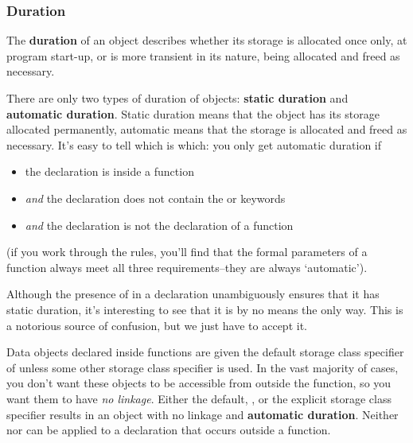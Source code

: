    \subsubsection{Duration}
    

    The \textbf{duration} of an object describes whether its storage is
     allocated once only, at program start-up, or is more transient in its
     nature, being allocated and freed as necessary.


    There are only two types of duration of objects: \textbf{static
     duration} and \textbf{automatic duration}. Static duration means
     that the object has its storage allocated permanently, automatic means
     that the storage is allocated and freed as necessary. It's easy to tell
     which is which: you only get automatic duration if


    \begin{itemize}
     \item the declaration is inside a function
     \item \textit{and} the declaration does not contain the
      \static{} or \extern{} keywords
     \item \textit{and} the declaration is not the declaration of a function
    \end{itemize}

    (if you work through the rules, you'll find that the formal
     parameters of a function always meet all three requirements--they
     are always `automatic').


    Although the presence of \static{} in a declaration
     unambiguously ensures that it has static duration, it's interesting to
     see that it is by no means the only way. This is a notorious source of
     confusion, but we just have to accept it.


    Data objects declared inside functions are given the default storage
     class specifier of \auto{} unless some other storage class
     specifier is used. In the vast majority of cases, you don't want these
     objects to be accessible from outside the function, so you want them to
     have \textit{no linkage}. Either the default, \auto, or the
     explicit \register{} storage class specifier results in an
     object with no linkage and \textbf{automatic duration}. Neither
     \auto{} nor \register{} can be applied to
     a declaration that occurs outside a function.


